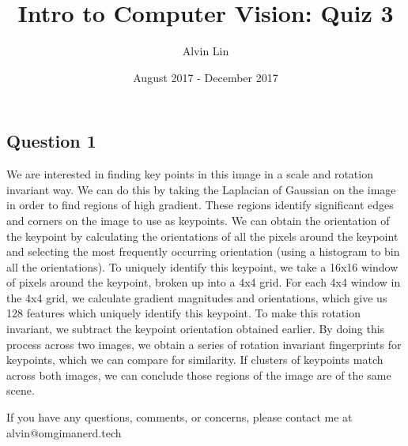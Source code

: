 \documentclass{math}
\title{Intro to Computer Vision: Quiz 3}
\author{Alvin Lin}
\date{August 2017 - December 2017}
\begin{document}
\maketitle

\subsection*{Question 1}
We are interested in finding key points in this image in a scale and rotation
invariant way. We can do this by taking the Laplacian of Gaussian on the image
in order to find regions of high gradient. These regions identify significant
edges and corners on the image to use as keypoints. We can obtain the
orientation of the keypoint by calculating the orientations of all the pixels
around the keypoint and selecting the most frequently occurring orientation
(using a histogram to bin all the orientations). To uniquely identify this
keypoint, we take a 16x16 window of pixels around the keypoint, broken up into
a 4x4 grid. For each 4x4 window in the 4x4 grid, we calculate gradient
magnitudes and orientations, which give us 128 features which uniquely identify
this keypoint. To make this rotation invariant, we subtract the keypoint
orientation obtained earlier. By doing this process across two images, we
obtain a series of rotation invariant fingerprints for keypoints, which we can
compare for similarity. If clusters of keypoints match across both images, we
can conclude those regions of the image are of the same scene.

\begin{center}
  If you have any questions, comments, or concerns, please contact me at
  alvin@omgimanerd.tech
\end{center}
\end{document}
